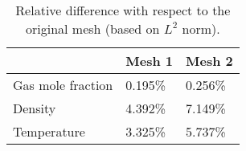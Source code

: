     \begin{table}[htbp]
        \centering
        \begin{minipage}{0.9\textwidth}
            \caption{Relative difference with respect to the original mesh (based on $L^2$ norm).} \label{converge:error}
            \begin{center}
                \begin{tabular}{@{}l|ll@{}} 
                    \toprule
                                      & Mesh 1   & Mesh 2   \\ 
                    \midrule
                    Gas mole fraction & 0.195\% & 0.256\% \\
                    Density           & 4.392\% & 7.149\% \\ 
                    Temperature       & 3.325\% & 5.737\% \\
                    \bottomrule
                \end{tabular}

            \end{center}
        \end{minipage}

    \end{table}

